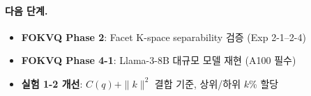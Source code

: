 \documentclass[11pt,a4paper]{article}
\begin{document}
\paragraph{다음 단계.}
\begin{itemize}[nosep]
  \item \textbf{FOKVQ Phase 2}: Facet K-space separability 검증 (Exp 2-1--2-4)
  \item \textbf{FOKVQ Phase 4-1}: Llama-3-8B 대규모 모델 재현 (A100 필수)
  \item \textbf{실험 1-2 개선}: $C(q) + \|k\|^2$ 결합 기준, 상위/하위 $k$\% 할당
\end{itemize}
\end{document}
